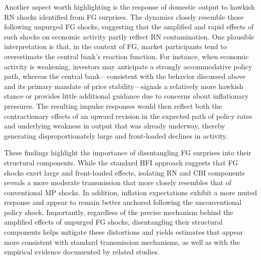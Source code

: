 \documentclass[\latexroot/\projectname]{subfiles}
\begin{document}
Another aspect worth highlighting is the response of domestic output to hawkish RN shocks identified from FG surprises. The dynamics closely resemble those following unpurged FG shocks, suggesting that the amplified and rapid effects of such shocks on economic activity partly reflect RN contamination. One plausible interpretation is that, in the context of FG, market participants tend to overestimate the central bank's reaction function. For instance, when economic activity is weakening, investors may anticipate a strongly accommodative policy path, whereas the central bank---consistent with the behavior discussed above and its primary mandate of price stability---signals a relatively more hawkish stance or provides little additional guidance due to concerns about inflationary pressures. The resulting impulse responses would then reflect both the contractionary effects of an upward revision in the expected path of policy rates and underlying weakness in output that was already underway, thereby generating disproportionately large and front-loaded declines in activity.


These findings highlight the importance of disentangling FG surprises into their structural components. While the standard HFI approach suggests that FG shocks exert large and front-loaded effects, isolating RN and CBI components reveals a more moderate transmission that more closely resembles that of conventional MP shocks. In addition, inflation expectations exhibit a more muted response and appear to remain better anchored following the unconventional policy shock. Importantly, regardless of the precise mechanism behind the amplified effects of unpurged FG shocks, disentangling their structural components helps mitigate these distortions and yields estimates that appear more consistent with standard transmission mechanisms, as well as with the empirical evidence documented by related studies.


\smartbib
\end{document}
